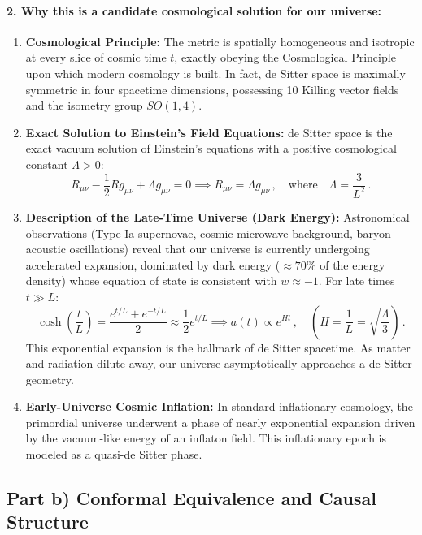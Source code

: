 \documentclass[12pt]{article}
\newcommand{\be}{\begin{equation}}
\newcommand{\ee}{\end{equation}}
\begin{document}
\paragraph{2. Why this is a candidate cosmological solution for our universe:}
\begin{enumerate}
    \item \textbf{Cosmological Principle:}
    The metric is spatially homogeneous and isotropic at every slice of cosmic time $t$, exactly obeying the Cosmological Principle upon which modern cosmology is built. In fact, de Sitter space is maximally symmetric in four spacetime dimensions, possessing 10 Killing vector fields and the isometry group $SO(1,4)$.
    
    \item \textbf{Exact Solution to Einstein's Field Equations:}
    de Sitter space is the exact vacuum solution of Einstein's equations with a positive cosmological constant $\Lambda > 0$:
    \be
    R_{\mu\nu} - \frac{1}{2} R g_{\mu\nu} + \Lambda g_{\mu\nu} = 0 \implies R_{\mu\nu} = \Lambda g_{\mu\nu} \,, \quad \text{where} \quad \Lambda = \frac{3}{L^2} \,.
    \ee

    \item \textbf{Description of the Late-Time Universe (Dark Energy):}
    Astronomical observations (Type Ia supernovae, cosmic microwave background, baryon acoustic oscillations) reveal that our universe is currently undergoing accelerated expansion, dominated by dark energy ($\approx 70\%$ of the energy density) whose equation of state is consistent with $w \approx -1$.
    For late times $t \gg L$:
    \be
    \cosh\left(\frac{t}{L}\right) = \frac{e^{t/L} + e^{-t/L}}{2} \approx \frac{1}{2} e^{t/L} \implies a(t) \propto e^{Ht} \,, \quad \left( H = \frac{1}{L} = \sqrt{\frac{\Lambda}{3}} \right) \,.
    \ee
    This exponential expansion is the hallmark of de Sitter spacetime. As matter and radiation dilute away, our universe asymptotically approaches a de Sitter geometry.

    \item \textbf{Early-Universe Cosmic Inflation:}
    In standard inflationary cosmology, the primordial universe underwent a phase of nearly exponential expansion driven by the vacuum-like energy of an inflaton field. This inflationary epoch is modeled as a quasi-de Sitter phase.
\end{enumerate}

\subsection*{Part b) Conformal Equivalence and Causal Structure}
\end{document}
